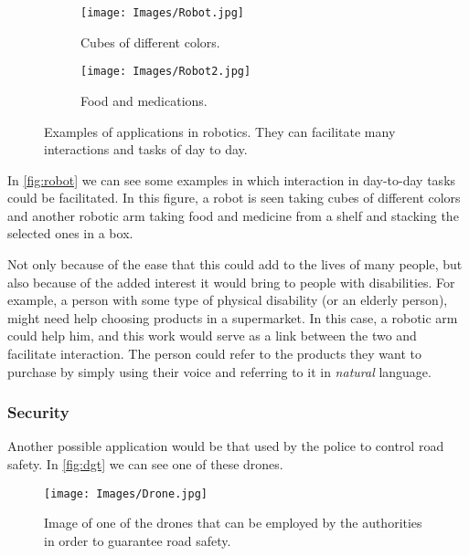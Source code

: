 \begin{figure}[ht]
  \centering
  \begin{subfigure}[t]{.55\textwidth}
    \centering
    \caption{Cubes of different colors.}
    \texttt{[image: Images/Robot.jpg]}
  \end{subfigure}\hfill
  \begin{subfigure}[t]{.4\textwidth}
    \centering
    \caption{Food and medications.}
    \texttt{[image: Images/Robot2.jpg]}
  \end{subfigure}
  \caption[Examples of applications in robotics]{Examples of applications in
    robotics. They can facilitate many interactions and tasks of day to day.}
  \label{fig:robot}
\end{figure}

In \vref{fig:robot} we can see some examples in which interaction in day-to-day
tasks could be facilitated. In this figure, a robot is seen taking cubes of
different colors and another robotic arm taking food and medicine from a shelf
and stacking the selected ones in a box.

Not only because of the ease that this could add to the lives of many people,
but also because of the added interest it would bring to people with
disabilities. For example, a person with some type of physical disability (or
an elderly person), might need help choosing products in a supermarket. In this
case, a robotic arm could help him, and this work would serve as a link between
the two and facilitate interaction. The person could refer to the products they
want to purchase by simply using their voice and referring to it in
\emph{natural} language.

\subsubsection{Security}
Another possible application would be that used by the police to control road
safety. In \vref{fig:dgt} we can see one of these drones.

\begin{figure}[ht]
  \centering
  \texttt{[image: Images/Drone.jpg]}
  \caption[Drones employed for road safety]{Image of one of the drones that can
    be employed by the authorities in order to guarantee road safety.}
  \label{fig:dgt}
\end{figure}

